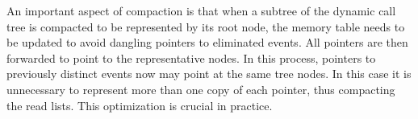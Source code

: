 An important aspect of compaction is that when a subtree of the dynamic
call tree is compacted to be represented by its root node, the memory table
needs to be updated to avoid dangling pointers to eliminated events. All
pointers are then forwarded to point to the representative nodes. In this
process, pointers to previously distinct events now may point at the same 
tree nodes. In this case it is unnecessary to represent more than one 
copy of each pointer, thus compacting the read lists. This optimization is 
crucial in practice.

\newcommand{\backlink}[3]
{\begin{picture}(#1,#2)
\put(0,0){\line(1,0){#1}}
\put(#1,0){\line(0,1){#2}}
\put(#1,#2){\vector(-1,0){#3}}
\end{picture}}

\newcommand{\rwblock}
{\begin{picture}(100,40)(-40,0)
\put(0,25){\line(4,3){20}}
\put(0,15){\line(4,-3){20}}
\put(-40,25){\line(1,0){40}}
\put(-40,15){\line(1,0){40}}
\put(20,0){\framebox(40,40){\ }}
\put(20,30){\line(1,0){40}}
\put(20,30){\makebox(40,10){Last write}}
\put(20,20){\makebox(40,10){Last reads}}
\put(20,5){\makebox(40,10){\vdots}}
\end{picture}}
